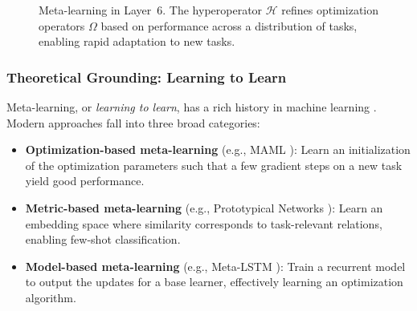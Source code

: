 \begin{figure}[htbp]
    \centering
    \caption{Meta-learning in Layer~6. The hyperoperator $\mathcal{H}$ refines optimization operators $\Omega$ based on performance across a distribution of tasks, enabling rapid adaptation to new tasks.}
    \label{fig:layer6}
\end{figure}

\subsubsection{Theoretical Grounding: Learning to Learn}
Meta-learning, or \emph{learning to learn}, has a rich history in machine learning \cite{thrun1998, bengio1990}. Modern approaches fall into three broad categories:

\begin{itemize}
    \item \textbf{Optimization-based meta-learning} (e.g., MAML \cite{finn2017}): Learn an initialization of the optimization parameters such that a few gradient steps on a new task yield good performance.
    \item \textbf{Metric-based meta-learning} (e.g., Prototypical Networks \cite{snell2017prototypical}): Learn an embedding space where similarity corresponds to task-relevant relations, enabling few-shot classification.
    \item \textbf{Model-based meta-learning} (e.g., Meta-LSTM \cite{ravi2017optimization}): Train a recurrent model to output the updates for a base learner, effectively learning an optimization algorithm.
\end{itemize}

